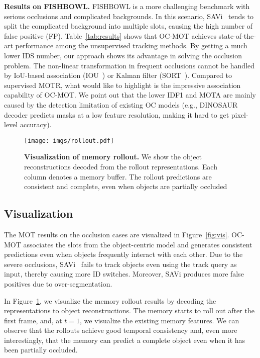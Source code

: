 \vspace{+2.5mm}
\noindent\textbf{Results on FISHBOWL.} FISHBOWL is a more challenging benchmark with serious occlusions and complicated backgrounds. 
In this scenario, SAVi~\cite{kipf2022conditional} tends to split the complicated background into multiple slots, causing the high number of false positive (FP).
Table~\ref{tab:results} shows that OC-MOT achieves state-of-the-art performance among the unsupervised tracking methods. By getting a much lower IDS number, our approach shows its advantage in solving the occlusion problem. The non-linear transformation in frequent occlusions cannot be handled by IoU-based association (IOU~\cite{bochinski2017high}) or Kalman filter (SORT~\cite{bewley2016simple}). 
Compared to supervised MOTR, what would like to highlight is the impressive association capability of OC-MOT. We point out that the lower IDF1 and MOTA are mainly caused by the detection limitation of existing OC models (e.g., DINOSAUR decoder predicts masks at a low feature resolution, making it hard to get pixel-level accuracy).

\begin{figure}[!h]
	\centering
	\texttt{[image: imgs/rollout.pdf]}
\caption{\textbf{Visualization of memory rollout.} We show the object reconstructions decoded from the rollout representations. Each column denotes a memory buffer. The rollout predictions are consistent and complete, even when objects are partially occluded
 }
\label{fig:rollout}
\end{figure}

\subsection{Visualization}
The MOT results on the occlusion cases are visualized in 
Figure~\ref{fig:vis}. OC-MOT associates the slots from the object-centric model and
generates consistent predictions even when objects frequently interact with each other. Due to the severe occlusions, SAVi~\cite{kipf2022conditional} fails to track objects even using the track query as input, thereby causing more ID switches. Moreover, SAVi produces more false positives due to over-segmentation.

In Figure~\ref{fig:rollout}, we visualize the memory rollout results by decoding the representations to object reconstructions. The memory starts to roll out after the first frame, and, at $t=1$, we visualize the existing memory features. We can observe that the rollouts achieve good temporal consistency and, even more interestingly, that the memory can predict a  complete object even when it has been partially occluded.



